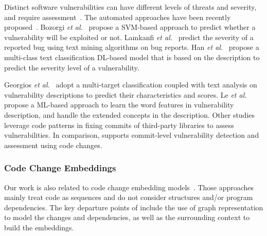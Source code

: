 Distinct software vulnerabilities can have different levels of threats
and severity, and require
assessment~\cite{nayak2014some,le2019automated,khan2018review}.
The automated approaches have been recently
proposed~\cite{bozorgi2010beyond,allodi2014comparing,deepCVA-ase21}.
Bozorgi {\em et al.}~\cite{bozorgi2010beyond} propose a SVM-based
approach to predict whether a vulnerability will be exploited or not.
Lamkanfi {\em et al.}~\cite{lamkanfi2010predicting} predict the
severity of a reported bug using text mining algorithms on bug reports.
%
Han {\em et al.}~\cite{han2017learning} propose a multi-class text
classification DL-based model that is based on the
description to predict the severity level of a vulnerability.

Georgios {\em et al.}~\cite{spanos2018multi} adopt a multi-target
classification coupled with text analysis on vulnerability
descriptions to predict their characteristics and scores.
Le {\em et al.}~\cite{le2019automated} propose a ML-based approach to
learn the word features in vulnerability description,
and handle the extended concepts in the description.
Other studies~\cite{ponta2018beyond,ponta2020detection} leverage code
patterns in fixing commits of third-party libraries to assess
vulnerabilities. In comparison,
{\tool} supports commit-level vulnerability detection and assessment
using code changes.



\vspace{-4pt}
\subsubsection*{\bf Code Change Embeddings}
Our work is also related to code change embedding
models~\cite{cc2vec,commit2vec}. Those approaches mainly treat code as
sequences and do not consider structures and/or program
dependencies. The key departure points of {\tool} include the use of
graph representation to model the changes and dependencies, as well as
the surrounding context to build the embeddings.
